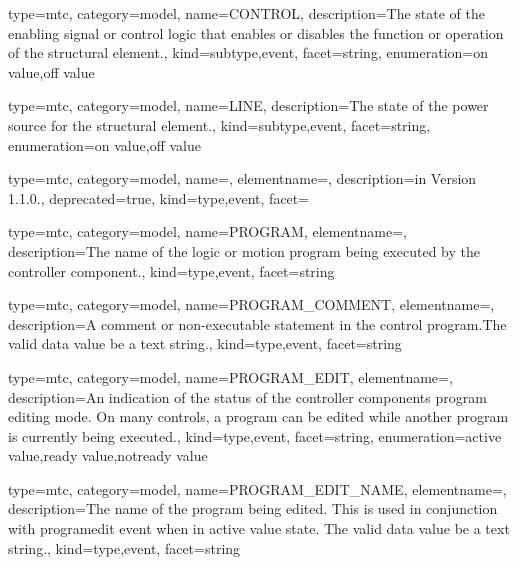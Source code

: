 {
  type=mtc,
  category=model,
  name={CONTROL},
  description={The state of the enabling signal or control logic that enables or disables the function or operation of the \gls{structural element}.},
  kind={subtype,event},
  facet={\gls{string}},
  enumeration={\gls{on value},\gls{off value}}
}


{
  type=mtc,
  category=model,
  name={LINE},
  description={The state of the power source for the \gls{structural element}.},
  kind={subtype,event},
  facet={\gls{string}},
  enumeration={\gls{on value},\gls{off value}}
}


{
  type=mtc,
  category=model,
  name=,
  elementname=,
  description={\DEPRECATED in Version 1.1.0.},
  deprecated={true},
  kind={type,event},
  facet={}
}


{
  type=mtc,
  category=model,
  name={PROGRAM},
  elementname=,
  description={The name of the logic or motion program being executed by the \gls{controller} component.},
  kind={type,event},
  facet={\gls{string}}
}


{
  type=mtc,
  category=model,
  name={PROGRAM\_COMMENT},
  elementname=,
  description={A comment or non-executable statement in the control program.The \gls{valid data value} \must be a text string.},
  kind={type,event},
  facet={\gls{string}}
}


{
  type=mtc,
  category=model,
  name={PROGRAM\_EDIT},
  elementname=,
  description={An indication of the status of the \gls{controller} components program editing mode. \newline On many controls, a program can be edited while another program is currently being executed.},
  kind={type,event},
  facet={\gls{string}},
  enumeration={\gls{active value},\gls{ready value},\gls{notready value}}
}


{
  type=mtc,
  category=model,
  name={PROGRAM\_EDIT\_NAME},
  elementname=,
  description={The name of the program being edited. \newline This is used in conjunction with \gls{programedit event} when in \gls{active value} state. \newline The \gls{valid data value} \must be a text string.},
  kind={type,event},
  facet={\gls{string}}
}



